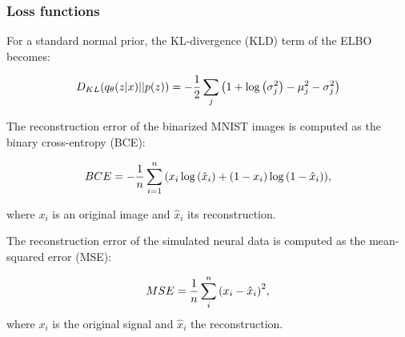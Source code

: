 \subsubsection{Loss functions}

For a standard normal prior, the KL-divergence (KLD) term of the ELBO becomes:

\begin{equation}
    D_{KL} \qty(q_\theta (z | x) || p(z)) = - \frac{1}{2}  \sum_j \qty(1 + \log \qty(\sigma_j^2) - \mu_j^2 - \sigma_j^2  )
\end{equation}

The reconstruction error of the binarized MNIST images is computed as the binary cross-entropy (BCE):

\begin{equation}
    BCE = - \frac{1}{n} \sum_{i=1}^n \qty(x_i \log \qty(\hat{x}_i) + \qty(1 - x_i) \log \qty(1-\hat{x}_i)  ),
\end{equation}

where $x_i$ is an original image and $\hat{x}_i$ its reconstruction. 

The reconstruction error of the simulated neural data is computed as the mean-squared error (MSE):

\begin{equation}
    MSE = \frac{1}{n} \sum_i^n \qty(x_i - \hat{x}_i)^2,
\end{equation}
where $x_i$ is the original signal and $\hat{x}_i$ the reconstruction.




